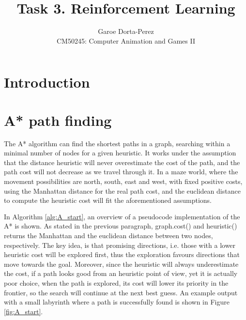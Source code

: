 \documentclass[12pt]{article}
\begin{document}
  
\title{Task 3. Reinforcement Learning}
\author{Garoe Dorta-Perez\\
CM50245: Computer Animation and Games II}
 
\maketitle
 
\section{Introduction}

\section{A* path finding}

The A*\cite{Hart1968} algorithm can find the shortest paths in a graph, searching within a minimal number of nodes for a given heuristic.
It works under the assumption that the distance heuristic will never overestimate the cost of the path, and the path cost will not decrease as we travel through it.
In a maze world, where the movement possibilities are north, south, east and west, with fixed positive costs, using the Manhattan distance for the real path cost, and the euclidean distance to compute the heuristic cost will fit the aforementioned assumptions.

In Algorithm \ref{alg:A_start}, an overview of a pseudocode implementation of the A* is shown.
As stated in the previous paragraph, graph.cost() and heuristic() returns the Manhattan and the euclidean distance between two nodes, respectively. 
The key idea, is that promising directions, i.e. those with a lower heuristic cost will be explored first, thus the exploration favours directions that move towards the goal.
Moreover, since the heuristic will always underestimate the cost, if a path looks good from an heuristic point of view, yet it is actually poor choice, when the path is explored, its cost will lower its priority in the frontier, so the search will continue at the next best guess.
An example output with a small labyrinth where a path is successfully found is shown in Figure \ref{fig:A_start}.
\end{document}
